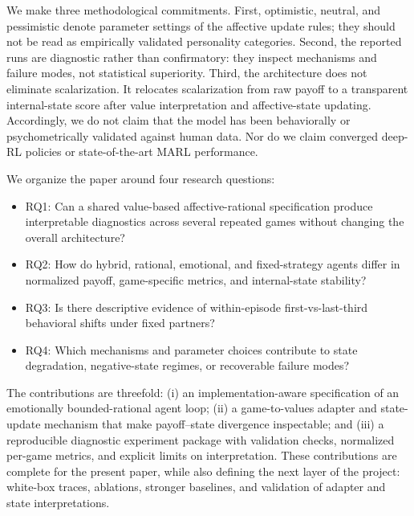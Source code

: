 \documentclass[runningheads]{llncs}
\begin{document}
We make three methodological commitments. First, optimistic, neutral, and pessimistic denote parameter settings of the affective update rules; they should not be read as empirically validated personality categories. Second, the reported runs are diagnostic rather than confirmatory: they inspect mechanisms and failure modes, not statistical superiority. Third, the architecture does not eliminate scalarization. It relocates scalarization from raw payoff to a transparent internal-state score after value interpretation and affective-state updating. Accordingly, we do not claim that the model has been behaviorally or psychometrically validated against human data. Nor do we claim converged deep-RL policies or state-of-the-art MARL performance.

We organize the paper around four research questions:
\begin{itemize}
\item RQ1: Can a shared value-based affective-rational specification produce interpretable diagnostics across several repeated games without changing the overall architecture?
\item RQ2: How do hybrid, rational, emotional, and fixed-strategy agents differ in normalized payoff, game-specific metrics, and internal-state stability?
\item RQ3: Is there descriptive evidence of within-episode first-vs-last-third behavioral shifts under fixed partners?
\item RQ4: Which mechanisms and parameter choices contribute to state degradation, negative-state regimes, or recoverable failure modes?
\end{itemize}

The contributions are threefold: (i) an implementation-aware specification of an emotionally bounded-rational agent loop; (ii) a game-to-values adapter and state-update mechanism that make payoff--state divergence inspectable; and (iii) a reproducible diagnostic experiment package with validation checks, normalized per-game metrics, and explicit limits on interpretation. These contributions are complete for the present paper, while also defining the next layer of the project: white-box traces, ablations, stronger baselines, and validation of adapter and state interpretations.
\end{document}
